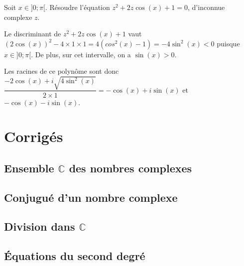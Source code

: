 \documentclass[11pt,fleqn, openany]{book} %
\begin{document}
\begin{exercise}[topic=cpx04]Soit $x\in]0;\pi[$. Résoudre l'équation $z^2+2z\cos(x)+1=0$, d'inconnue complexe $z$.\end{exercise}

\begin{solution}Le discriminant de $z^2+2z\cos(x)+1$ vaut $(2\cos(x))^2-4\times 1 \times 1=4(cos^2(x)-1)=-4\sin^2(x)<0$ puisque $x\in]0;\pi[$. De plus, sur cet intervalle, on a $\sin(x)>0$.

Les racines de ce polynôme sont donc $\dfrac{-2\cos(x)+i\sqrt{4\sin^2(x)}}{2 \times 1}=-\cos(x)+i\sin(x)$ et $-\cos(x)-i\sin(x)$.\end{solution}


\chapter{Corrigés}

\section*{Ensemble $\mathbb{C}$ des nombres complexes}

\printsolutions[collection={cpx01}, headings={false} ]

\section*{Conjugué d'un nombre complexe}

\printsolutions[collection={cpx02}, headings={false} ]

\section*{Division dans $\mathbb{C}$}

\printsolutions[collection={cpx03}, headings={false} ]

\section*{Équations du second degré}

\printsolutions[collection={cpx04}, headings={false} ]
\end{document}
